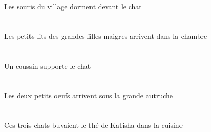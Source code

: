 \begin{exe}
 Les souris du village dorment devant le chat
\ex\glll
   \DEFPlAbs{}    \DEFPlObl{}   \grandCPl{}   \maigreCPl{}   \filleCPlObl{}   \DE{}   \petitDPl{}   \litDPlAbs{}    \DEFSgObl{}   \chambreBSgObl{}   \DANS{}  \arriverViPrsDPl{} \\
   \DEFPlAbsP{}    \DEFPlOblP{}   \grandCPlP{}   \maigreCPlP{}   \filleCPlOblP{}   \DEP{}   \petitDPlP{}   \litDPlAbsP{}    \DEFSgOblP{}   \chambreBSgOblP{}   \DANSP{}  \arriverViPrsDPlP{} \\
   \DEFPlAbsG{}    \DEFPlOblG{}   \grandCPlG{}   \maigreCPlG{}   \filleCPlOblG{}   \DEG{}   \petitDPlG{}   \litDPlAbsG{}    \DEFSgOblG{}   \chambreBSgOblG{}   \DANSG{}  \arriverViPrsDPlG{} \\
 Les petits lits des grandes filles maigres arrivent dans la chambre
\ex\glll
   \INDSgErg{}   \coussinBSgErg{}   \DEFSgAbs{}   \chatDSgAbs{}  \supporterVtPrsDSg{} \\
   \INDSgErgP{}   \coussinBSgErgP{}   \DEFSgAbsP{}   \chatDSgAbsP{}  \supporterVtPrsDSgP{} \\
   \INDSgErgG{}   \coussinBSgErgG{}   \DEFSgAbsG{}   \chatDSgAbsG{}  \supporterVtPrsDSgG{} \\
 Un coussin supporte le chat
\ex\glll
   \DEFDuAbs{}   \petitCDu{}   \oeufCDuAbs{}    \DEFSgObl{}   \grandBSg{}   \autrucheBSgObl{}   \SOUS{}  \arriverViPrsCDu{} \\
   \DEFDuAbsP{}   \petitCDuP{}   \oeufCDuAbsP{}    \DEFSgOblP{}   \grandBSgP{}   \autrucheBSgOblP{}   \SOUSP{}  \arriverViPrsCDuP{} \\
   \DEFDuAbsG{}   \petitCDuG{}   \oeufCDuAbsG{}    \DEFSgOblG{}   \grandBSgG{}   \autrucheBSgOblG{}   \SOUSG{}  \arriverViPrsCDuG{} \\
 Les deux petits oeufs arrivent sous la grande autruche
\ex\glll
    \DEFSgObl{}   \cuisineDSgObl{}   \DANS{}   \DEMPlErg{}   \troisDPl{}   \chatDPlErg{}   \DEFSgAbs{}    \INDSgObl{}   \KatishaASgObl{}   \DE{}   \theBSgAbs{}  \boireVtPstBSg{} \\
    \DEFSgOblP{}   \cuisineDSgOblP{}   \DANSP{}   \DEMPlErgP{}   \troisDPlP{}   \chatDPlErgP{}   \DEFSgAbsP{}    \INDSgOblP{}   \KatishaASgOblP{}   \DEP{}   \theBSgAbsP{}  \boireVtPstBSgP{} \\
    \DEFSgOblG{}   \cuisineDSgOblG{}   \DANSG{}   \DEMPlErgG{}   \troisDPlG{}   \chatDPlErgG{}   \DEFSgAbsG{}    \INDSgOblG{}   \KatishaASgOblG{}   \DEG{}   \theBSgAbsG{}  \boireVtPstBSgG{} \\
 Ces trois chats buvaient le thé de Katisha dans la cuisine
\ex\glll
    \INDPlObl{}   \coussinBPlObl{}   \SUR{}   \DEFPlErg{}   \infirmiereAPlErg{}   \INDPlAbs{}   \oeufCPlAbs{}  \mangerVtPrsCPl{} \\

\end{exe}
